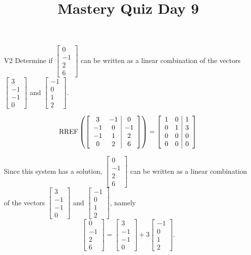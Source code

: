 \documentclass{sbgLAquiz}
\title{Mastery Quiz Day 9 }
\begin{document}
\begin{problem}{V2}
Determine if $\begin{bmatrix}0 \\ -1 \\ 2 \\ 6 \end{bmatrix}$ can be written as a linear combination of the vectors $\begin{bmatrix} 3 \\ -1 \\ -1 \\ 0 \end{bmatrix}$ and $\begin{bmatrix} -1 \\ 0 \\ 1 \\ 2 \end{bmatrix}$.
\end{problem}
\begin{solution}
$$\operatorname{RREF}\left(\left[\begin{array}{cc|c} 3 & -1 & 0 \\ -1 & 0 & -1 \\ -1 & 1 & 2 \\ 0 & 2 & 6\end{array} \right] \right)= \left[ \begin{array}{cc|c} 1 & 0 & 1 \\ 0 & 1 & 3 \\ 0 & 0 & 0 \\ 0 & 0 & 0 \end{array} \right]$$

Since this system has a solution, $\begin{bmatrix}0 \\ -1 \\ 2 \\ 6 \end{bmatrix}$ can be written as a linear combination of the vectors $\begin{bmatrix} 3 \\ -1 \\ -1 \\ 0 \end{bmatrix}$ and $\begin{bmatrix} -1 \\ 0 \\ 1 \\ 2 \end{bmatrix}$, namely
$$\begin{bmatrix}0 \\ -1 \\ 2 \\ 6 \end{bmatrix}=\begin{bmatrix} 3 \\ -1 \\ -1 \\ 0 \end{bmatrix}+3\begin{bmatrix} -1 \\ 0 \\ 1 \\ 2 \end{bmatrix}.$$
\end{solution}
\end{document}
